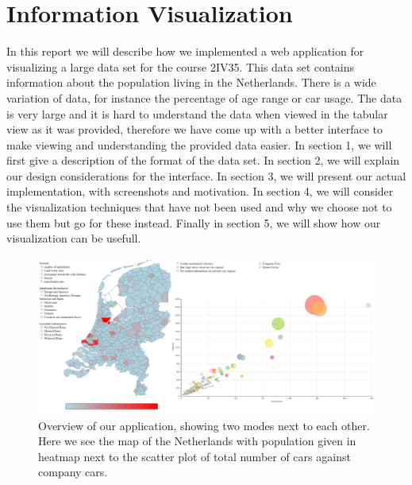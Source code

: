 \documentclass[a4paper,twoside,11pt]{article}
\begin{document}
\section*{Information Visualization}
In this report we will describe how we implemented a web application for visualizing a large data set for the course 2IV35. This data set contains information about the population living in the Netherlands.  \newline
There is a wide variation of data, for instance the percentage of age range or car usage. The data is very large and it is hard to understand the data when viewed in the tabular view as it was provided, therefore we have come up with a better interface to make viewing and understanding the provided data easier. \newline
In section 1, we will first give a description of the format of the data set. \newline
In section 2, we will explain our design considerations for the interface. \newline
In section 3, we will present our actual implementation, with screenshots and motivation. \newline
In section 4, we will consider the visualization techniques that have not been used and why we choose not to use them but go for these instead. \newline
Finally in section 5, we will show how our visualization can be usefull. \newline
\newline
\newline
\newline
\newline
\newline
\begin{figure}[h]
  \begin{center}
    \includegraphics[width=1\textwidth]{FullScreen2}
  \end{center}
  \caption{Overview of our application, showing two modes next to each other. Here we see the map of the Netherlands with population given in heatmap next to the scatter plot of total number of cars against company cars.}
\end{figure}
\end{document}
